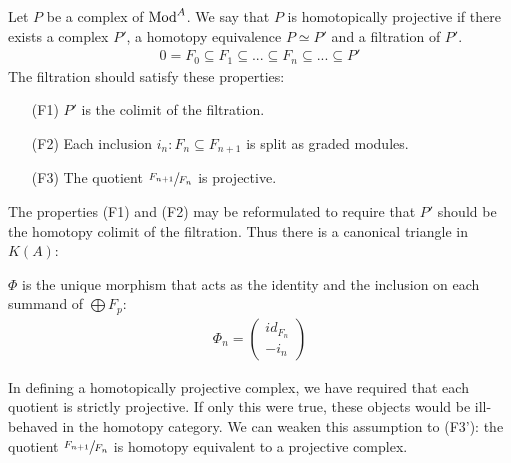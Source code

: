 \documentclass[../thesis.tex]{subfiles}
\begin{document}
            \begin{definition}
                Let $P$ be a complex of $\tt{Mod}^A$. We say that $P$ is homotopically projective if there exists a complex $P'$, a homotopy equivalence $P \simeq P'$ and a filtration of $P'$.
                \begin{align*}
                    0 = F_0 \subseteq F_1 \subseteq ... \subseteq F_n \subseteq ... \subseteq P'
                \end{align*}
                The filtration should satisfy these properties:
                \begin{itemize}
                    \item[(F1)] $P'$ is the colimit of the filtration.
                    \item[(F2)] Each inclusion $i_n : F_n \subseteq F_{n+1}$ is split as graded modules.
                    \item[(F3)] The quotient $\sfrac{F_{n+1}}{F_n}$ is projective.
                \end{itemize}
            \end{definition}

            \begin{remark}
                The properties (F1) and (F2) may be reformulated to require that $P'$ should be the homotopy colimit of the filtration. Thus there is a canonical triangle in $K(A)$:
                \begin{center}
                \end{center}
                $\Phi$ is the unique morphism that acts as the identity and the inclusion on each summand of $\bigoplus F_p$:
                \begin{align*}
                    \Phi_n = \begin{pmatrix}
                        id_{F_n} \\ -i_n
                    \end{pmatrix}
                \end{align*}
            \end{remark}

            In defining a homotopically projective complex, we have required that each quotient is strictly projective. If only this were true, these objects would be ill-behaved in the homotopy category. We can weaken this assumption to (F3'): the quotient $\sfrac{F_{n+1}}{F_n}$ is homotopy equivalent to a projective complex.
\end{document}
